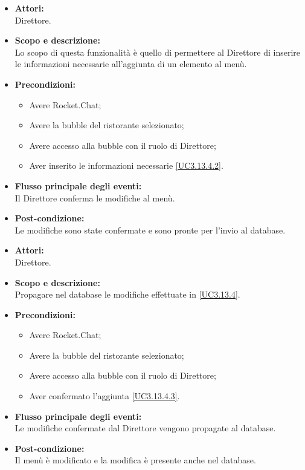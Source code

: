 
\begin{itemize}
	\item \textbf{Attori:}
	\\Direttore.
	\item \textbf{Scopo e descrizione:} 
	\\Lo scopo di questa funzionalità è quello di permettere al Direttore di inserire le informazioni necessarie all'aggiunta di un elemento al menù.
	\item \textbf{Precondizioni:}
	\begin{itemize}
		\item Avere Rocket.Chat;
		\item Avere la bubble del ristorante selezionato;
		\item Avere accesso alla bubble con il ruolo di Direttore;
		\item Aver inserito le informazioni necessarie \ref{UC3.13.4.2}.
	\end{itemize}
	\item \textbf{Flusso principale degli eventi:}
	\\Il Direttore conferma le modifiche al menù.
	\item \textbf{Post-condizione:}
	\\Le modifiche sono state confermate e sono pronte per l'invio al database.
\end{itemize}


\begin{itemize}
	\item \textbf{Attori:}
	\\Direttore.
	\item \textbf{Scopo e descrizione:} 
	\\Propagare nel database le modifiche effettuate in \ref{UC3.13.4}.
	\item \textbf{Precondizioni:}
	\begin{itemize}
		\item Avere Rocket.Chat;
		\item Avere la bubble del ristorante selezionato;
		\item Avere accesso alla bubble con il ruolo di Direttore;
		\item Aver confermato l'aggiunta \ref{UC3.13.4.3}.
	\end{itemize}
	\item \textbf{Flusso principale degli eventi:}
	\\Le modifiche confermate dal Direttore vengono propagate al database.
	\item \textbf{Post-condizione:}
	\\Il menù è modificato e la modifica è presente anche nel database.
\end{itemize}

